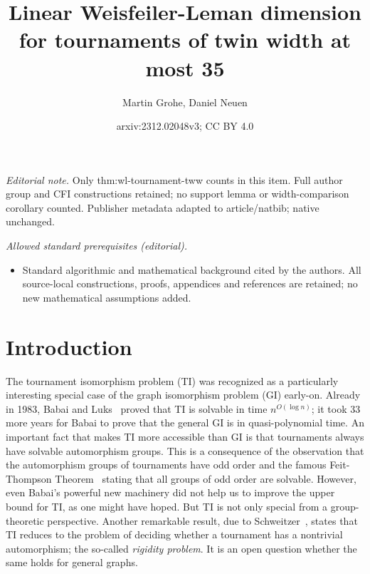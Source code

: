 \PassOptionsToPackage{dvipsnames,svgnames}{xcolor}\documentclass[10pt,a4paper]{article}
\title{Linear Weisfeiler-Leman dimension for tournaments of twin width at most 35}
\author{Martin Grohe, Daniel Neuen}
\date{arxiv:2312.02048v3; CC BY 4.0}
\begin{document}
\maketitle
\noindent\textit{Editorial note.} Only thm:wl-tournament-tww counts in this item. Full author group and CFI constructions retained; no support lemma or width-comparison corollary counted. Publisher metadata adapted to article/natbib; native unchanged.\par\medskip
\noindent\textit{Allowed standard prerequisites (editorial).}\begin{itemize}
\item Standard algorithmic and mathematical background cited by the authors. All source-local constructions, proofs, appendices and references are retained; no new mathematical assumptions added.
\end{itemize}\medskip
\section{Introduction}

The tournament isomorphism problem (TI) was recognized as a particularly interesting special case of the graph isomorphism problem (GI) early-on.
Already in 1983, Babai and Luks~\cite{BabaiL83} proved that TI is solvable in time $n^{O(\log n)}$;
it took 33 more years for Babai \cite{Babai16} to prove that the general GI is in quasi-polynomial time.
An important fact that makes TI more accessible than GI is that tournaments always have solvable automorphism groups.
This is a consequence of the observation that the automorphism groups of tournaments have odd order and the famous Feit-Thompson Theorem~\cite{FeitT63} stating that all groups of odd order are solvable.
However, even Babai's powerful new machinery did not help us to improve the upper bound for TI, as one might have hoped.
But TI is not only special from a group-theoretic perspective.
Another remarkable result, due to Schweitzer~\cite{Schweitzer17}, states that TI reduces to the problem of deciding whether a tournament has a nontrivial automorphism; the so-called \emph{rigidity problem}.
It is an open question whether the same holds for general graphs.
\end{document}
